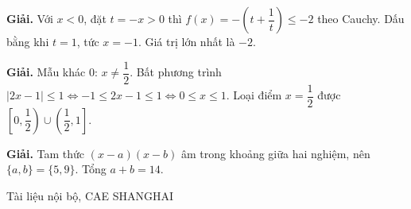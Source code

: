 \documentclass[11pt, a4paper]{article}
\begin{document}
\vspace{0.3cm}
\begin{dapan}[46 — Đáp án B]

\textbf{Giải.} Với $x<0$, đặt $t=-x>0$ thì $f(x)=-\left(t+\dfrac{1}{t}\right)\le-2$ theo Cauchy. Dấu bằng khi $t=1$, tức $x=-1$. Giá trị lớn nhất là $-2$.


\end{dapan}
\vspace{0.3cm}
\begin{dapan}[47 — Đáp án D]

\textbf{Giải.} Mẫu khác $0$: $x\ne\dfrac{1}{2}$. Bất phương trình $\lvert 2x-1\rvert\le1 \iff -1\le2x-1\le1 \iff 0\le x\le1$. Loại điểm $x=\dfrac{1}{2}$ được $\left[0,\dfrac{1}{2}\right)\cup\left(\dfrac{1}{2},1\right]$.


\end{dapan}
\vspace{0.3cm}
\begin{dapan}[48 — Đáp án A]

\textbf{Giải.} Tam thức $(x-a)(x-b)$ âm trong khoảng giữa hai nghiệm, nên $\{a,b\}=\{5,9\}$. Tổng $a+b=14$.
\end{dapan}
\vspace{0.3cm}

\vspace{0.8cm}
\begin{center}
{\footnotesize\color{cae_blue} Tài liệu nội bộ, CAE SHANGHAI}
\end{center}
\end{document}
